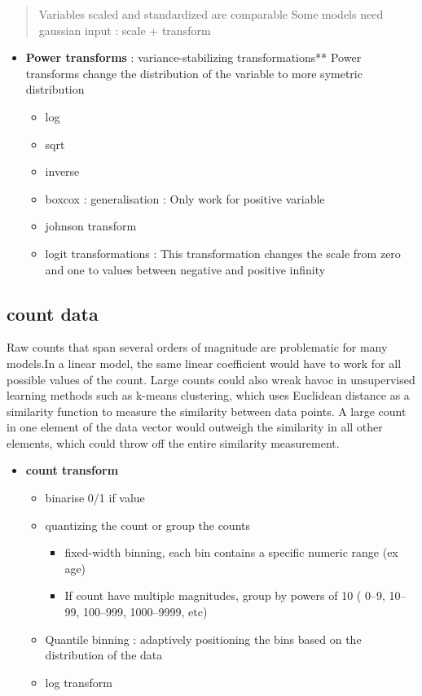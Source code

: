 \documentclass[]{book}
\providecommand{\tightlist}{%
  \setlength{\itemsep}{0pt}\setlength{\parskip}{0pt}}
\theoremstyle{definition}
\theoremstyle{definition}
\theoremstyle{definition}
\theoremstyle{remark}
\begin{document}
\begin{quote}
Variables scaled and standardized are comparable Some models need
gaussian input : scale + transform
\end{quote}

\begin{itemize}
\tightlist
\item
  \textbf{Power transforms} : variance-stabilizing transformations**
  Power transforms change the distribution of the variable to more
  symetric distribution

  \begin{itemize}
  \tightlist
  \item
    log
  \item
    sqrt
  \item
    inverse
  \item
    boxcox : generalisation : Only work for positive variable
  \item
    johnson transform
  \item
    logit transformations : This transformation changes the scale from
    zero and one to values between negative and positive infinity
  \end{itemize}
\end{itemize}

\subsection{count data}\label{count-data}

Raw counts that span several orders of magnitude are problematic for
many models.In a linear model, the same linear coefficient would have to
work for all possible values of the count. Large counts could also wreak
havoc in unsupervised learning methods such as k-means clustering, which
uses Euclidean distance as a similarity function to measure the
similarity between data points. A large count in one element of the data
vector would outweigh the similarity in all other elements, which could
throw off the entire similarity measurement.

\begin{itemize}
\tightlist
\item
  \textbf{count transform}

  \begin{itemize}
  \tightlist
  \item
    binarise 0/1 if value
  \item
    quantizing the count or group the counts

    \begin{itemize}
    \tightlist
    \item
      fixed-width binning, each bin contains a specific numeric range
      (ex age)
    \item
      If count have multiple magnitudes, group by powers of 10 ( 0--9,
      10--99, 100--999, 1000--9999, etc)
    \end{itemize}
  \item
    Quantile binning : adaptively positioning the bins based on the
    distribution of the data
  \item
    log transform
  \end{itemize}
\end{itemize}
\end{document}
